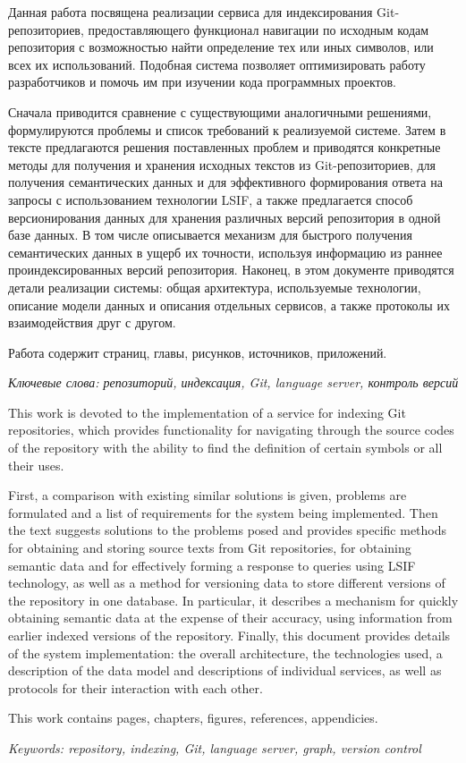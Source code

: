 
Данная работа посвящена реализации сервиса для индексирования Git-репозиториев, предоставляющего функционал навигации по исходным кодам репозитория с возможностью найти определение тех или иных символов, или всех их использований. Подобная система позволяет оптимизировать работу разработчиков и помочь им при изучении кода программных проектов.

Сначала приводится сравнение с существующими аналогичными решениями, формулируются проблемы и список требований к реализуемой системе. Затем в тексте предлагаются решения поставленных проблем и приводятся конкретные методы для получения и хранения исходных текстов из Git-репозиториев, для получения семантических данных и для эффективного формирования ответа на запросы с использованием технологии LSIF, а также предлагается способ версионирования данных для хранения различных версий репозитория в одной базе данных. В том числе описывается механизм для быстрого получения семантических данных в ущерб их точности, используя информацию из раннее проиндексированных версий репозитория. Наконец, в этом документе приводятся детали реализации системы: общая архитектура, используемые технологии, описание модели данных и описания отдельных сервисов, а также протоколы их взаимодействия друг с другом.

Работа содержит \pageref*{LastPage} страниц,  главы, \totalfigures{} рисунков,  источников,  приложений.

\textit{Ключевые слова: репозиторий, индексация, Git, language server, контроль версий}

\clearpage


This work is devoted to the implementation of a service for indexing Git repositories, which provides functionality for navigating through the source codes of the repository with the ability to find the definition of certain symbols or all their uses.

First, a comparison with existing similar solutions is given, problems are formulated and a list of requirements for the system being implemented. Then the text suggests solutions to the problems posed and provides specific methods for obtaining and storing source texts from Git repositories, for obtaining semantic data and for effectively forming a response to queries using LSIF technology, as well as a method for versioning data to store different versions of the repository in one database. In particular, it describes a mechanism for quickly obtaining semantic data at the expense of their accuracy, using information from earlier indexed versions of the repository. Finally, this document provides details of the system implementation: the overall architecture, the technologies used, a description of the data model and descriptions of individual services, as well as protocols for their interaction with each other.

This work contains \pageref*{LastPage} pages,  chapters, \totalfigures{} figures,  references,  appendicies.

\textit{Keywords: repository, indexing, Git, language server, graph, version control}


\clearpage